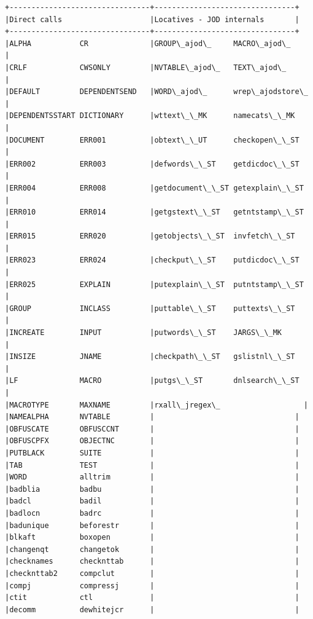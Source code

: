 \documentclass[11pt,letter,landscape]{article}
\begin{document}
    \begin{Verbatim}[commandchars=\\\{\}]
+--------------------------------+--------------------------------+
|Direct calls                    |Locatives - JOD internals       |
+--------------------------------+--------------------------------+
|ALPHA           CR              |GROUP\_ajod\_     MACRO\_ajod\_     |
|CRLF            CWSONLY         |NVTABLE\_ajod\_   TEXT\_ajod\_      |
|DEFAULT         DEPENDENTSEND   |WORD\_ajod\_      wrep\_ajodstore\_ |
|DEPENDENTSSTART DICTIONARY      |wttext\_\_MK      namecats\_\_MK    |
|DOCUMENT        ERR001          |obtext\_\_UT      checkopen\_\_ST   |
|ERR002          ERR003          |defwords\_\_ST    getdicdoc\_\_ST   |
|ERR004          ERR008          |getdocument\_\_ST getexplain\_\_ST  |
|ERR010          ERR014          |getgstext\_\_ST   getntstamp\_\_ST  |
|ERR015          ERR020          |getobjects\_\_ST  invfetch\_\_ST    |
|ERR023          ERR024          |checkput\_\_ST    putdicdoc\_\_ST   |
|ERR025          EXPLAIN         |putexplain\_\_ST  putntstamp\_\_ST  |
|GROUP           INCLASS         |puttable\_\_ST    puttexts\_\_ST    |
|INCREATE        INPUT           |putwords\_\_ST    JARGS\_\_MK       |
|INSIZE          JNAME           |checkpath\_\_ST   gslistnl\_\_ST    |
|LF              MACRO           |putgs\_\_ST       dnlsearch\_\_ST   |
|MACROTYPE       MAXNAME         |rxall\_jregex\_                   |
|NAMEALPHA       NVTABLE         |                                |
|OBFUSCATE       OBFUSCCNT       |                                |
|OBFUSCPFX       OBJECTNC        |                                |
|PUTBLACK        SUITE           |                                |
|TAB             TEST            |                                |
|WORD            alltrim         |                                |
|badblia         badbu           |                                |
|badcl           badil           |                                |
|badlocn         badrc           |                                |
|badunique       beforestr       |                                |
|blkaft          boxopen         |                                |
|changenqt       changetok       |                                |
|checknames      checknttab      |                                |
|checknttab2     compclut        |                                |
|compj           compressj       |                                |
|ctit            ctl             |                                |
|decomm          dewhitejcr      |                                |

\end{Verbatim}
\end{document}
